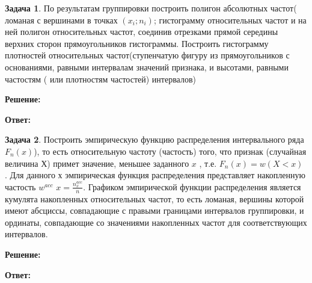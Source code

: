 \documentclass[a4paper,12pt]{article}
\theoremstyle{definition}
\newtheorem{problem}{Задача}
\newenvironment{solution}
{\begin{shaded}\textbf{Решение:}\par\setlength{\parindent}{0pt}}
{\end{shaded}}
\newenvironment{answer}
{\par\noindent\textbf{Ответ:} }
{\par}
\begin{document}
\vspace{8pt}
\begin{problem}
    По результатам группировки построить полигон абсолютных частот( ломаная с
    вершинами в точках \((x_i; n_i)\); гистограмму относительных частот и на ней полигон
    относительных частот, соединив отрезками прямой середины верхних сторон
    прямоугольников гистограммы.
    Построить гистограмму плотностей относительных частот(ступенчатую фигуру
    из прямоугольников с основаниями, равными интервалам значений признака, и
    высотами, равными частостям ( или плотностям частостей) интервалов)
    
        \begin{solution}
            
        \end{solution}
    
        \begin{answer}
            
        \end{answer}
    
    \end{problem}



\vspace{8pt}
\begin{problem}
    Построить эмпирическую функцию распределения интервального ряда \(F_n(x)\)), то
    есть относительную частоту (частость) того, что признак (случайная величина \(Х\)) 
    примет значение, меньшее заданного \(x\) , т.е. \(F_n(x) = w(X < x)\) . Для данного \(х\)
    эмпирическая функция распределения представляет накопленную частость \(w^{acc}\) 
    \(x = \frac{n^{acc}_x}{n}\).
    Графиком эмпирической функции распределения является кумулята накопленных
    относительных частот, то есть ломаная, вершины которой имеют абсциссы,
    совпадающие с правыми границами интервалов группировки, и ординаты,
    совпадающие со значениями накопленных частот для соответствующих
    интервалов.
    
        \begin{solution}
            
        \end{solution}
    
        \begin{answer}
        \end{answer}
    
    \end{problem}
\end{document}
